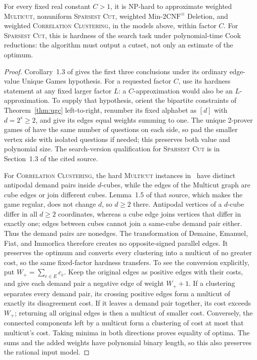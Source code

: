 \begin{corollary}
\label{cor:cut-clustering}
For every fixed real constant \(C>1\), it is NP-hard to approximate
weighted \textup{\textsc{Multicut}}, nonuniform \textup{\textsc{Sparsest Cut}}, weighted
Min-\(2\mathrm{CNF}^{\equiv}\) Deletion, and weighted
\textup{\textsc{Correlation Clustering}}, in the models above, within factor \(C\).
For \textup{\textsc{Sparsest Cut}}, this is hardness of the search task under
polynomial-time Cook reductions: the algorithm must output a cutset,
not only an estimate of the optimum.
\end{corollary}
\begin{proof}
Corollary~1.3 of \cite{CKKRS2006} gives the first three conclusions
under its ordinary edge-value Unique Games hypothesis.
For a requested factor \(C\), use its hardness statement at any fixed
larger factor \(L\): a \(C\)-approximation would also be an
\(L\)-approximation.
To supply that hypothesis, orient the bipartite constraints of
Theorem~\ref{thm:ugc} left-to-right, renumber its fixed alphabet as
\([d]\) with \(d=2^s\ge2\), and give its edges equal weights summing
to one. The unique 2-prover games of \cite[Section~1.2]{CKKRS2006} have the
same number of questions on each side, so pad the smaller vertex side
with isolated questions if needed; this preserves both value and
polynomial size. The search-version
qualification for \textsc{Sparsest Cut} is in Section~1.3 of the
cited source.

For \textsc{Correlation Clustering}, the hard \textsc{Multicut}
instances in~\cite[Section~2.1]{CKKRS2006} have distinct antipodal
demand pairs inside \(d\)-cubes, while the edges of the Multicut graph
are cube edges or join different cubes. Lemma~1.5 of that source, which makes the game regular, does not
change \(d\), so \(d\ge2\) there. Antipodal vertices of a \(d\)-cube
differ in all \(d\ge2\) coordinates, whereas a cube edge joins vertices
that differ in exactly one; edges between cubes cannot join
a same-cube demand pair either. Thus the demand pairs are nonedges. The transformation of
Demaine, Emanuel, Fiat, and Immorlica
\cite[Theorem~4.7 and Corollary~4.8]{DemaineEtAl2006Clustering}
therefore creates no opposite-signed parallel edges. It preserves the
optimum and converts every clustering into a multicut of no greater
cost, so the same fixed-factor hardness transfers.
To see the conversion explicitly, put \(W_+=\sum_{e\in E}c_e\).
Keep the original edges as positive edges with their costs, and give
each demand pair a negative edge of weight \(W_++1\).
If a clustering separates every demand pair, its crossing positive
edges form a multicut of exactly its disagreement cost.  If it leaves
a demand pair together, its cost exceeds \(W_+\); returning all
original edges is then a multicut of smaller cost.  Conversely, the
connected components left by a multicut form a clustering of cost at
most that multicut's cost.  Taking minima in both directions proves
equality of optima.  The sums and the added weights have polynomial
binary length, so this also preserves the rational input model.
\end{proof}


